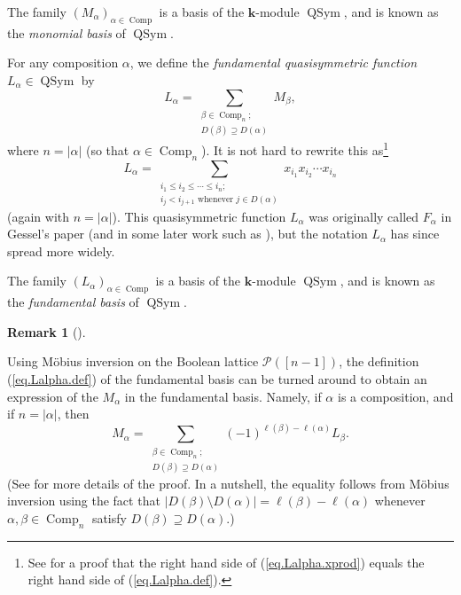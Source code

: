 \documentclass[numbers=enddot,12pt,final,onecolumn,notitlepage]{scrartcl}%
\theoremstyle{definition}
\newtheorem{remk}[theo]{Remark}
\newenvironment{remark}[1][]
{\begin{remk}[#1]\begin{leftbar}}
{\end{leftbar}\end{remk}}
\let\sumnonlimits\sum
\renewcommand{\sum}{\sumnonlimits\limits}
\newenvironment{verlong}{}{}
\begin{document}
The family $\left(  M_{\alpha}\right)  _{\alpha\in\operatorname*{Comp}}$ is a
basis of the $\mathbf{k}$-module $\operatorname*{QSym}$, and is known as the
\emph{monomial basis} of $\operatorname*{QSym}$.

For any composition $\alpha$, we define the \emph{fundamental quasisymmetric
function }$L_{\alpha}\in\operatorname*{QSym}$ by
\begin{equation}
L_{\alpha}=\sum_{\substack{\beta\in\operatorname*{Comp}\nolimits_{n}%
;\\D\left(  \beta\right)  \supseteq D\left(  \alpha\right)  }}M_{\beta},
\label{eq.Lalpha.def}%
\end{equation}
where $n=\left\vert \alpha\right\vert $ (so that $\alpha\in
\operatorname*{Comp}\nolimits_{n}$). It is not hard to rewrite this
as\footnote{See \cite[detailed version, Corollary 10.18]{Grinbe15} for a proof
that the right hand side of (\ref{eq.Lalpha.xprod}) equals the right hand side
of (\ref{eq.Lalpha.def}).}%
\begin{equation}
L_{\alpha}=\sum_{\substack{i_{1}\leq i_{2}\leq\cdots\leq i_{n};\\i_{j}%
<i_{j+1}\text{ whenever }j\in D\left(  \alpha\right)  }}x_{i_{1}}x_{i_{2}%
}\cdots x_{i_{n}} \label{eq.Lalpha.xprod}%
\end{equation}
(again with $n=\left\vert \alpha\right\vert $). This quasisymmetric function
$L_{\alpha}$ was originally called $F_{\alpha}$ in Gessel's paper
\cite{Gessel84} (and in some later work such as \cite{Malven93}), but the
notation $L_{\alpha}$ has since spread more widely.

The family $\left(  L_{\alpha}\right)  _{\alpha\in\operatorname*{Comp}}$ is a
basis of the $\mathbf{k}$-module $\operatorname*{QSym}$, and is known as the
\emph{fundamental basis} of $\operatorname*{QSym}$.

\begin{verlong}


\begin{remark}
Using M\"{o}bius inversion on the Boolean lattice $\mathcal{P}\left(  \left[
n-1\right]  \right)  $, the definition (\ref{eq.Lalpha.def}) of the
fundamental basis can be turned around to obtain an expression of the
$M_{\alpha}$ in the fundamental basis. Namely, if $\alpha$ is a composition,
and if $n=\left\vert \alpha\right\vert $, then%
\[
M_{\alpha}=\sum_{\substack{\beta\in\operatorname*{Comp}\nolimits_{n}%
;\\D\left(  \beta\right)  \supseteq D\left(  \alpha\right)  }}\left(
-1\right)  ^{\ell\left(  \beta\right)  -\ell\left(  \alpha\right)  }L_{\beta
}.
\]
(See \cite[Proposition 5.2.8]{GriRei} for more details of the proof. In a
nutshell, the equality follows from M\"{o}bius inversion using the fact that
$\left\vert D\left(  \beta\right)  \setminus D\left(  \alpha\right)
\right\vert =\ell\left(  \beta\right)  -\ell\left(  \alpha\right)  $ whenever
$\alpha,\beta\in\operatorname*{Comp}\nolimits_{n}$ satisfy $D\left(
\beta\right)  \supseteq D\left(  \alpha\right)  $.)
\end{remark}
\end{verlong}
\end{document}
